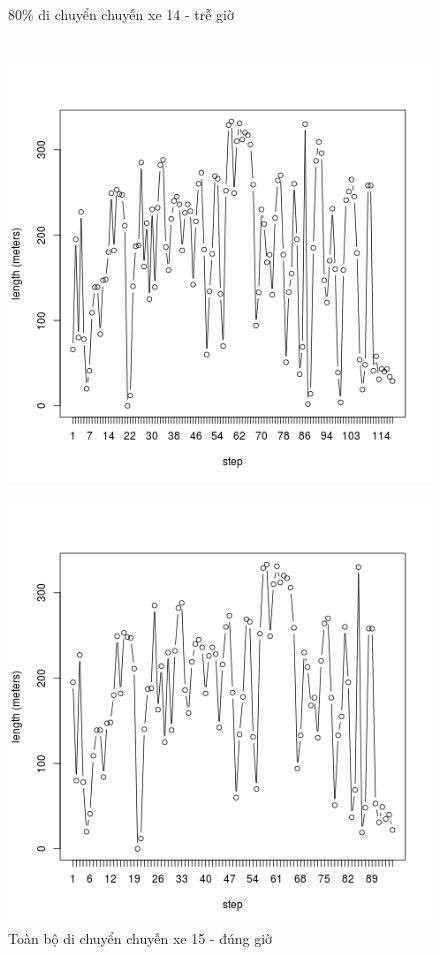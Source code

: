 \documentclass[a4paper, 13pt]{report}
\begin{document}
\begin{figure}[!htb]
  \caption*{80\% di chuyển chuyến xe 14 - trễ giờ}
\endminipage\\
  \includegraphics[width=\linewidth]{test_100_15}
  \caption*{Toàn bộ di chuyển chuyến xe 15 - đúng giờ}
\endminipage
{}
  \includegraphics[width=\linewidth]{test_80_15}

\end{figure}
\end{document}
